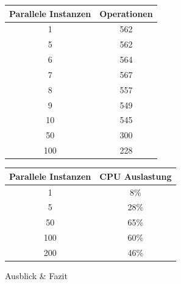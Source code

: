 \begin{frame}
	
	
	\begin{center}
	
	\begin{tabular}{c|c}
	Parallele Instanzen & Operationen\\
	\hline%
	 1	&562\\
	5	&562\\
	6	&564\\
	7	&567\\
	8	&557\\
	9	&549\\
	10	&545\\
	50&	300\\
	100 &	228\\
	\end{tabular}
	
	\end{center}
	

\end{frame}

\begin{frame}	
	\begin{center}
	
	\begin{tabular}{c|c}
	Parallele Instanzen & CPU Auslastung\\
	\hline
	 1	& 8\%\\
	5	& 28\%\\
	50	& 65\%\\
	100	& 60\%\\
	200	& 46\%\\
	\end{tabular}
	
	\end{center}
\end{frame}

\begin{frame}
\begin{center}
\begin{scriptsize}
\LARGE Ausblick \& Fazit

\end{scriptsize}
\end{center}
\end{frame}
